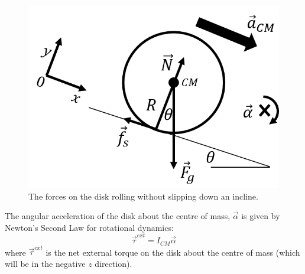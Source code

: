 \begin{framed}
\begin{framed}
\begin{figure}[!htbp]
\centering
\includegraphics[width=0.4\linewidth]{files/diskslope_fbd-6c0bbf5637c869c1dcecbcc6a840deaf.png}
\caption[]{The forces on the disk rolling without slipping down an incline.}
\label{fig:angularmomentumrolling:diskslope_fbd}
\end{figure}

The angular acceleration of the disk about the centre of mass, $\vec \alpha$ is given by Newton's Second Law for rotational dynamics:
\begin{equation}
\vec\tau^{ext} = I_{CM}\vec\alpha
\end{equation}
where $\vec\tau^{ext}$ is the net external torque on the disk about the centre of mass (which will be in the negative $z$ direction).


\end{framed}
\end{framed}
